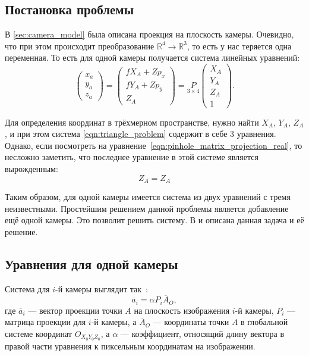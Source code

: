 \documentclass[14pt, a4paper]{extarticle}
\begin{document}
\subsection{Постановка проблемы} 
В \ref{sec:camera_model} была описана проекция на плоскость камеры. Очевидно,
что при этом происходит преобразование $\mathbb{R}^4 \rightarrow \mathbb{R}^3$,
то есть у нас теряется одна переменная. То есть для одной камеры получается
система линейных уравнений:
\begin{equation}
    \begin{pmatrix}
        x_a\\
        y_a\\
        z_a
    \end{pmatrix} = \begin{pmatrix}
        f X_A + Z p_x\\
        f Y_A + Z p_y\\
        Z_A 
    \end{pmatrix} = \underset{3 \times 4}{P} \begin{pmatrix}
        X_A\\
        Y_A\\
        Z_A\\
        1
    \end{pmatrix}.
\label{eqn:triangle_problem}
\end{equation}

Для определения координат в трёхмерном пространстве, нужно найти $X_A$, $Y_A$,
$Z_A$, и при этом система \eqref{eqn:triangle_problem} содержит в себе 3
уравнения. Однако, если посмотреть на
уравнение~\eqref{eqn:pinhole_matrix_projection_real}, то несложно заметить, что
последнее уравнение в этой системе является вырожденным:
\begin{equation*}
    Z_A = Z_A
\end{equation*}
\par
Таким образом, для одной камеры имеется система из двух уравнений с тремя
неизвестными. Простейшим решением данной проблемы является добавление ещё одной
камеры. Это позволит решить систему. В \cite{multiview_cv} и \cite{dlt_temugeb}
описана данная задача и её решение. 
\subsection{Уравнения для одной камеры}
Система для $i$-й камеры выглядит так~\cite{multiview_cv, dlt_temugeb}:
\begin{equation}
    \overline{a}_i = \alpha P_i \overline{A}_O,
\label{eqn:general_dlt}
\end{equation}
где $\overline{a}_i$ --- вектор проекции точки $A$ на плоскость изображения
$i$-й камеры, $P_i$ --- матрица проекции для $i$-й камеры, а $\overline{A}_O$
--- координаты точки $A$ в глобальной системе координат $O_{X_0Y_0Z_0}$, а
$\alpha$ --- коэффициент, относящий длину вектора в правой части уравнения к
пиксельным координатам на изображении.
\end{document}
